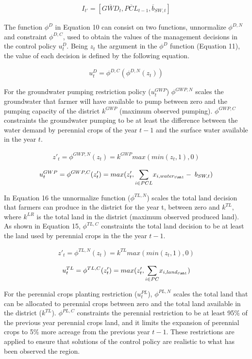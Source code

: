 \documentclass[11pt,a4paper]{article}
\begin{document}
\begin{align}
I_{t'} = [\overline{GWD}_{t},\overline{PCL}_{t-1},\overline{b}_{SW,t}]
\end{align}

The function $\phi^{D}$ in Equation 10 can consist on two functions, unnormalize $\phi^{D,N}$ and constraint $\phi^{D,C}$, used to obtain the values of the management decisions in the control policy $u_{t}^D$. Being $z_{t}$ the argument in the $\phi^{D}$ function (Equation 11), the value of each decision is defined by the following equation.

\begin{align}
u^{D}_t = \phi^{D,C}(\phi^{D,N}(z_{t}))
\end{align}

For the groundwater pumping restriction policy ($u^{GWP}_t$) $\phi^{GWP,N}$ scales the groundwater that farmer will have available to pump between zero and the pumping capacity of the district $k^{GWP}$ (maximum observed pumping). $\phi^{GWP,C}$ constraints the groundwater pumping to be at least the difference between the water demand by perennial crops of the year $t-1$ and the surface water available in the year $t$. 

\begin{align}
z'_{t}=\phi^{GWP,N}(z_{t}) = k^{GWP}max(min(z_{t},1),0) 
\end{align}

\begin{align}
u^{GWP}_t = \phi^{GWP,C}(z'_{t})= max(z'_{t},\underset{i \in PCL}{\sum} x_{i,water_{t\mh1}} - \; b_{SW,t})
\end{align}

In Equation 16 the unnormalize function ($\phi^{TL,N}$) scales the total land decision that farmers can produce in the district for the year t, between zero and $k^{TL}$, where $k^{LR}$ is the total land in the district (maximum observed produced land). As shown in Equation 15, $\phi^{TL,C}$ constraints the total land decision to be at least the land used by perennial crops in the the year $t-1$.

\begin{align}
z'_{t} = \phi^{TL,N}(z_{t}) = k^{TL}max(min(z_{t},1),0)
\end{align}

\begin{align}
u^{TL}_t = \phi^{TL,C}(z'_{t})= max(z'_{t},\underset{i \in PC}{\sum} x_{i,land_{t\mh1}})
\end{align}


For the perennial crops planting restriction ($u^{PL}_t$), $\phi^{PL,N}$ scales the total land that can be allocated to perennial crops between zero and the total land available in the district ($k^{TL}$). $\phi^{PL,C}$ constraints the perennial restriction to be at least 95\% of the previous year perennial crops land, and it limits the expansion of perennial crops to 5\% more acreage from the previous year $t-1$. These restrictions are applied to ensure that solutions of the control policy are realistic to what has been observed the region.
\end{document}
